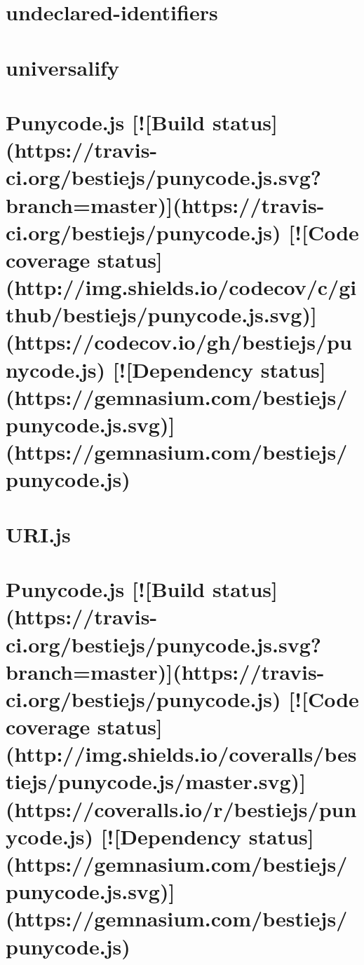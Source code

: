\documentclass[twoside]{book}
\newcommand{\+}{\discretionary{\mbox{\scriptsize$\hookleftarrow$}}{}{}}
\begin{document}
\chapter{undeclared-\/identifiers}
\label{md_dsmacc_examples_DRmerge_node_modules_undeclared-identifiers_README}

\chapter{universalify}
\label{md_dsmacc_examples_DRmerge_node_modules_universalify_README}

\chapter{Punycode.\+js \mbox{[}!\mbox{[}Build status\mbox{]}(https\+://travis-\/ci.org/bestiejs/punycode.js.\+svg?branch=master)\mbox{]}(https\+://travis-\/ci.org/bestiejs/punycode.js) \mbox{[}!\mbox{[}Code coverage status\mbox{]}(http\+://img.shields.\+io/codecov/c/github/bestiejs/punycode.js.\+svg)\mbox{]}(https\+://codecov.io/gh/bestiejs/punycode.js) \mbox{[}!\mbox{[}Dependency status\mbox{]}(https\+://gemnasium.com/bestiejs/punycode.js.\+svg)\mbox{]}(https\+://gemnasium.com/bestiejs/punycode.js)}
\label{md_dsmacc_examples_DRmerge_node_modules_uri-js_node_modules_punycode_README}

\chapter{U\+R\+I.\+js}
\label{md_dsmacc_examples_DRmerge_node_modules_uri-js_README}

\chapter{Punycode.\+js \mbox{[}!\mbox{[}Build status\mbox{]}(https\+://travis-\/ci.org/bestiejs/punycode.js.\+svg?branch=master)\mbox{]}(https\+://travis-\/ci.org/bestiejs/punycode.js) \mbox{[}!\mbox{[}Code coverage status\mbox{]}(http\+://img.shields.\+io/coveralls/bestiejs/punycode.js/master.svg)\mbox{]}(https\+://coveralls.io/r/bestiejs/punycode.js) \mbox{[}!\mbox{[}Dependency status\mbox{]}(https\+://gemnasium.com/bestiejs/punycode.js.\+svg)\mbox{]}(https\+://gemnasium.com/bestiejs/punycode.js)}
\label{md_dsmacc_examples_DRmerge_node_modules_url_node_modules_punycode_README}

\end{document}
